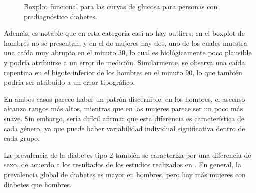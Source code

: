 \begin{figure}[H]
 \centering
    \caption{Boxplot funcional para las curvas de glucosa para personas con prediagnóstico diabetes.}
    \label{fig:glucosaDiabetes}
\end{figure}

Además, es notable que en esta categoría casi no hay outliers; en el boxplot de hombres no se presentan, y en el de mujeres hay dos, uno de los cuales muestra una caída muy abrupta en el minuto $30$, lo cual es biológicamente poco plausible y podría atribuirse a un error de medición. Similarmente, se observa una caída repentina en el bigote inferior de los hombres en el minuto $90$, lo que también podría ser atribuido a un error tipográfico.

En ambos casos parece haber un patrón discernible: en los hombres, el ascenso alcanza rangos más altos, mientras que en las mujeres parece ser un poco más suave. Sin embargo, sería difícil afirmar que esta diferencia es característica de cada género, ya que puede haber variabilidad individual significativa dentro de cada grupo.

La prevalencia de la diabetes tipo 2 también se caracteriza por una diferencia de sexo, de acuerdo a los resultados de los estudios realizados en \cite{GenderDifferences2018}. En general, la prevalencia global de diabetes es mayor en hombres, pero hay más mujeres con diabetes que hombres.

